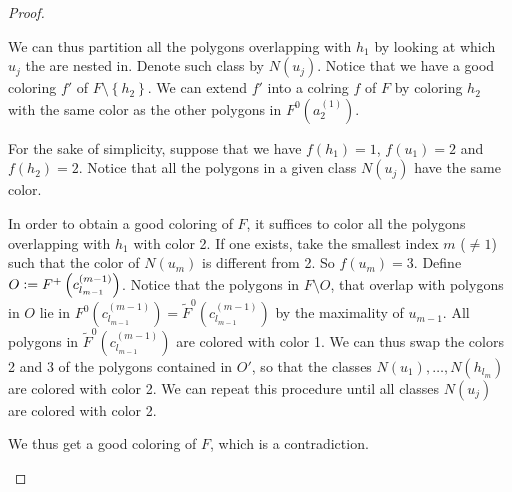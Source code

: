 \documentclass[12pt]{article}
\theoremstyle{definition}
\newcommand{\defeq}{\vcentcolon=}
\begin{document}
\begin{proof}
\begin{itemize}
\begin{figure}[ht]
\begin{center}
{\begin{tikzpicture}[line width=0.7pt, line cap=round]
             \end{tikzpicture}
             }
             \end{center}
             \caption{}
             \label{figure:multi}
             \end{figure} 

             We can thus partition all the
             polygons overlapping with
             $h_1$ by looking at which $u_{j}$ 
             the are nested in. Denote
             such class by $N\left(u_{j}\right)$.
             Notice that we have a good coloring
             $f'$ of $F \setminus \left\{h_2\right\}$.
             We can extend $f'$ into a colring
             $f$ of $F$ by coloring $h_2$ with
             the same color as the other polygons in
             $F^{0}\left(a_2^{\left(1\right)}\right)$.

             For the sake of simplicity,
             suppose that we have
             $f\left(h_1\right) = 1$,
             $f\left(u_1\right) = 2$ and
             $f\left(h_2\right) = 2$.
             Notice that all the polygons
             in a given class $N\left(u_{j}\right)$ 
             have the same color.

             In order to obtain a good coloring
             of $F$, it suffices to color all the polygons
             overlapping with $h_1$ with color 2.
             If one exists, take the smallest index
             $m$ ($\neq 1$) such that 
             the color of $N\left(u_{m}\right)$ 
             is different from 2. So $f\left(u_{m}\right) = 3$.
             Define $O \defeq F^{+}\left(c_{l_{m-1}}^{\left(m-1\right)}\right)$.
             Notice that the polygons 
             in $F \setminus O$, that overlap
             with polygons in $O$ lie in
             $F^{0}\left(c_{l_{m-1}}^{\left(m-1\right)}\right) =
             \widetilde{F}^{0}\left(c_{l_{m-1}}^{\left(m -1\right)}\right)$
             by the maximality of $u_{m-1}$.
             All polygons in
             $\widetilde{F}^{0}\left(c_{l_{m-1}}^{\left(m -1\right)}\right)$
             are colored
             with color 1.
             We can thus swap the colors
             2 and 3 of the polygons 
             contained in $O'$, so that
             the classes $N\left(u_1\right),
             \ldots, N\left(h_{l_{m}}\right)$ are
             colored with color 2.
             We can repeat this procedure until
             all classes $N\left(u_{j}\right)$ 
             are colored with color 2.
             
             We thus get a good coloring
             of $F$, which is a contradiction.


\end{itemize}
\end{proof}
\end{document}
